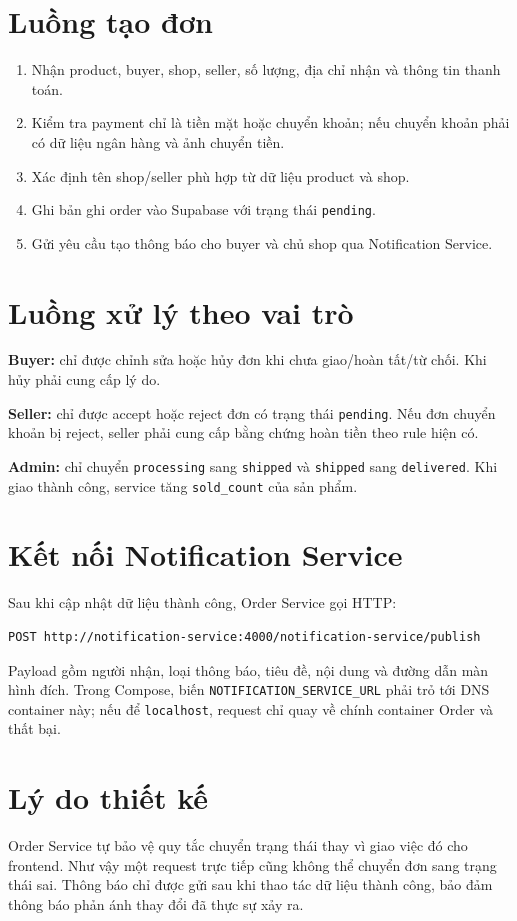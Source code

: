 \documentclass[12pt]{article}
\begin{document}
\section{Luồng tạo đơn}
\begin{enumerate}
  \item Nhận product, buyer, shop, seller, số lượng, địa chỉ nhận và thông tin thanh toán.
  \item Kiểm tra payment chỉ là tiền mặt hoặc chuyển khoản; nếu chuyển khoản phải có dữ liệu ngân hàng và ảnh chuyển tiền.
  \item Xác định tên shop/seller phù hợp từ dữ liệu product và shop.
  \item Ghi bản ghi order vào Supabase với trạng thái \texttt{pending}.
  \item Gửi yêu cầu tạo thông báo cho buyer và chủ shop qua Notification Service.
\end{enumerate}

\section{Luồng xử lý theo vai trò}
\textbf{Buyer:} chỉ được chỉnh sửa hoặc hủy đơn khi chưa giao/hoàn tất/từ chối. Khi hủy phải cung cấp lý do.

\textbf{Seller:} chỉ được accept hoặc reject đơn có trạng thái \texttt{pending}. Nếu đơn chuyển khoản bị reject, seller phải cung cấp bằng chứng hoàn tiền theo rule hiện có.

\textbf{Admin:} chỉ chuyển \texttt{processing} sang \texttt{shipped} và \texttt{shipped} sang \texttt{delivered}. Khi giao thành công, service tăng \texttt{sold\_count} của sản phẩm.

\section{Kết nối Notification Service}
Sau khi cập nhật dữ liệu thành công, Order Service gọi HTTP:
\begin{verbatim}
POST http://notification-service:4000/notification-service/publish
\end{verbatim}
Payload gồm người nhận, loại thông báo, tiêu đề, nội dung và đường dẫn màn hình đích. Trong Compose, biến \texttt{NOTIFICATION\_SERVICE\_URL} phải trỏ tới DNS container này; nếu để \texttt{localhost}, request chỉ quay về chính container Order và thất bại.

\section{Lý do thiết kế}
Order Service tự bảo vệ quy tắc chuyển trạng thái thay vì giao việc đó cho frontend. Như vậy một request trực tiếp cũng không thể chuyển đơn sang trạng thái sai. Thông báo chỉ được gửi sau khi thao tác dữ liệu thành công, bảo đảm thông báo phản ánh thay đổi đã thực sự xảy ra.
\end{document}
